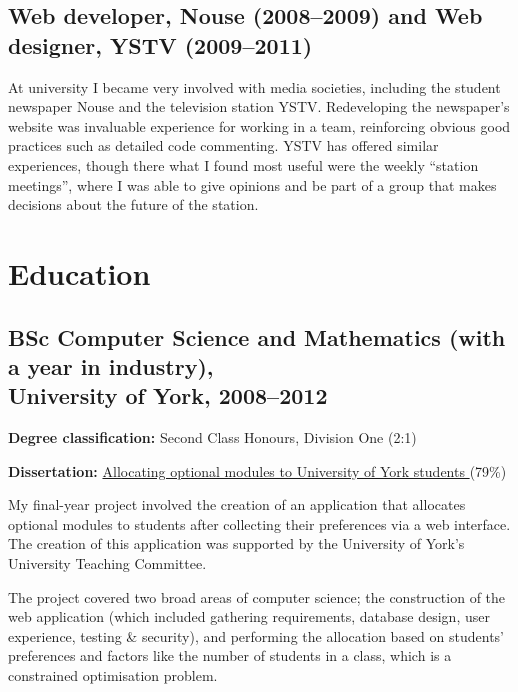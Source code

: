 \documentclass[10pt,a4paper]{article}
\renewenvironment{itemize}{
  \begin{list}{}{
    \setlength{\leftmargin}{1em}
    \setlength{\itemsep}{0em}
    \setlength{\parskip}{0pt}
    \setlength{\parsep}{0.2em}
  }
}{
  \end{list}
}
\begin{document}
\subsection*{Web developer, Nouse (2008--2009) and Web designer, YSTV (2009--2011)}

At university I became very involved with media societies, including the
student newspaper Nouse and the television station YSTV. Redeveloping the
newspaper's website was invaluable experience for working in a team,
reinforcing obvious good practices such as detailed code commenting. YSTV has
offered similar experiences, though there what I found most useful were the
weekly ``station meetings'', where I was able to give opinions and be
part of a group that makes decisions about the future of the station.

\section*{Education}

\subsection*{BSc Computer Science and Mathematics (with a year in industry), \\
  University of York, 2008--2012}

\begin{itemize}
  \item \textbf{Degree classification:} Second Class Honours, Division One (2:1)
  \item \textbf{Dissertation:}
    \href{http://alex.mullr.net/blog/2012/03/constrained-optimisation-allocate-modules-york/}{
      Allocating optional modules to University of York students
    } (79\%)
\end{itemize}

My final-year project involved the creation of an application that allocates
optional modules to students after collecting their preferences via a web
interface. The creation of this application was supported by the University of
York's University Teaching Committee.

The project covered two broad areas of computer science; the construction of
the web application (which included gathering requirements, database design,
user experience, testing \& security), and performing the allocation based on
students' preferences and factors like the number of students in a class,
which is a constrained optimisation problem.
\end{document}
